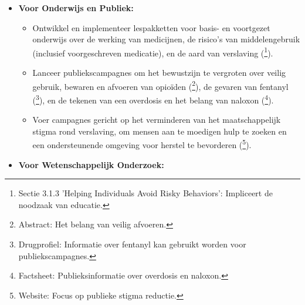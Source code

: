 \documentclass[11pt, a4paper]{report} %
\begin{document}
\begin{itemize}
\begin{itemize}
            \item Werk actief aan het verminderen van stigma rond pijn en verslaving in de eigen praktijk en in de communicatie met patiënten en collega's (\cite{CDCStigmaReduction}\footnote{Website: Handvatten voor stigma reductie door zorgverleners.}). Benader verslaving als een behandelbare chronische ziekte.
            \item Overweeg het co-prescriberen van naloxon aan patiënten met een verhoogd risico op overdosis (\cite{Dowell2016CDCGuideline}\footnote{Aanbeveling 8: Overweeg naloxon bij risicopatiënten.}) en instrueer hen en hun naasten over het gebruik ervan.
            \item Werk samen met specialisten in pijnmanagement en verslavingszorg voor complexe casuïstiek (\cite{Norman2022GPAttitudes}\footnote{Conclusie: Suggereert behoefte aan betere ondersteuning en samenwerking voor huisartsen.}).
        \end{itemize}
    \item \textbf{Voor Onderwijs en Publiek:}
        \begin{itemize}
            \item Ontwikkel en implementeer lespakketten voor basis- en voortgezet onderwijs over de werking van medicijnen, de risico's van middelengebruik (inclusief voorgeschreven medicatie), en de aard van verslaving (\cite{Yarosh2020ComputationalSupportSUD}\footnote{Sectie 3.1.3 'Helping Individuals Avoid Risky Behaviors': Impliceert de noodzaak van educatie.}).
            \item Lanceer publiekscampagnes om het bewustzijn te vergroten over veilig gebruik, bewaren en afvoeren van opioïden (\cite{Hasan2022OptimizingReturnDisposalOpioids}\footnote{Abstract: Het belang van veilig afvoeren.}), de gevaren van fentanyl (\cite{EMCDDAFentanylProfile}\footnote{Drugprofiel: Informatie over fentanyl kan gebruikt worden voor publiekscampagnes.}), en de tekenen van een overdosis en het belang van naloxon (\cite{WHO2023Opioid}\footnote{Factsheet: Publieksinformatie over overdosis en naloxon.}).
            \item Voer campagnes gericht op het verminderen van het maatschappelijk stigma rond verslaving, om mensen aan te moedigen hulp te zoeken en een ondersteunende omgeving voor herstel te bevorderen (\cite{CDCStigmaReduction}\footnote{Website: Focus op publieke stigma reductie.}).
        \end{itemize}
    \item \textbf{Voor Wetenschappelijk Onderzoek:}

\end{itemize}
\end{document}
